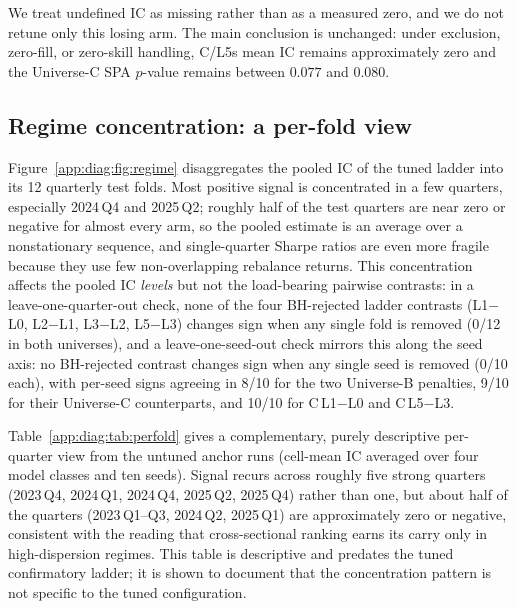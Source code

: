 \documentclass{article}
\begin{document}
We treat undefined IC as missing rather than as a measured zero, and we do not retune only this losing arm. The main conclusion is unchanged: under exclusion, zero-fill, or zero-skill handling, C/L5s mean IC remains approximately zero and the Universe-C SPA $p$-value remains between $0.077$ and $0.080$.

\subsection{Regime concentration: a per-fold view}\label{app:diag:regime}

Figure~\ref{app:diag:fig:regime} disaggregates the pooled IC of the tuned ladder into its 12 quarterly test folds. Most positive signal is concentrated in a few quarters, especially 2024\,Q4 and 2025\,Q2; roughly half of the test quarters are near zero or negative for almost every arm, so the pooled estimate is an average over a nonstationary sequence, and single-quarter Sharpe ratios are even more fragile because they use few non-overlapping rebalance returns. This concentration affects the pooled IC \emph{levels} but not the load-bearing pairwise contrasts: in a leave-one-quarter-out check, none of the four BH-rejected ladder contrasts \citep{benjamini1995controlling} (L1$-$L0, L2$-$L1, L3$-$L2, L5$-$L3) changes sign when any single fold is removed (0/12 in both universes), and a leave-one-seed-out check mirrors this along the seed axis: no BH-rejected contrast changes sign when any single seed is removed (0/10 each), with per-seed signs agreeing in 8/10 for the two Universe-B penalties, 9/10 for their Universe-C counterparts, and 10/10 for C\,L1$-$L0 and C\,L5$-$L3.

Table~\ref{app:diag:tab:perfold} gives a complementary, purely descriptive per-quarter view from the untuned anchor runs (cell-mean IC averaged over four model classes and ten seeds). Signal recurs across roughly five strong quarters (2023\,Q4, 2024\,Q1, 2024\,Q4, 2025\,Q2, 2025\,Q4) rather than one, but about half of the quarters (2023\,Q1--Q3, 2024\,Q2, 2025\,Q1) are approximately zero or negative, consistent with the reading that cross-sectional ranking earns its carry only in high-dispersion regimes. This table is descriptive and predates the tuned confirmatory ladder; it is shown to document that the concentration pattern is not specific to the tuned configuration.
\end{document}

